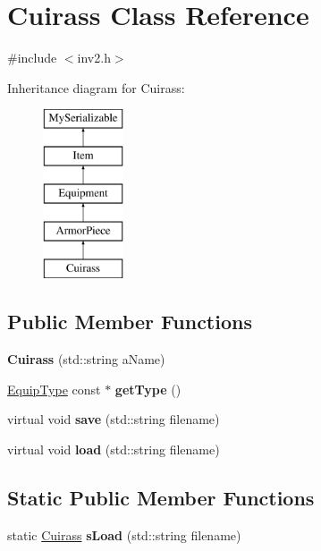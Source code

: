 \hypertarget{class_cuirass}{}\section{Cuirass Class Reference}
\label{class_cuirass}


{\ttfamily \#include $<$inv2.\+h$>$}

Inheritance diagram for Cuirass\+:\begin{figure}[H]
\begin{center}
\leavevmode
\includegraphics[height=5.000000cm]{class_cuirass}
\end{center}
\end{figure}
\subsection*{Public Member Functions}
\begin{DoxyCompactItemize}
\item 
\hypertarget{class_cuirass_a4fe284b22f6d10ab28098eac7b65ed41}{}\label{class_cuirass_a4fe284b22f6d10ab28098eac7b65ed41} 
{\bfseries Cuirass} (std\+::string a\+Name)
\item 
\hypertarget{class_cuirass_a214e66939642605ab737c5e92d72e1a2}{}\label{class_cuirass_a214e66939642605ab737c5e92d72e1a2} 
\hyperlink{class_equip_type}{Equip\+Type} const  $\ast$ {\bfseries get\+Type} ()
\item 
\hypertarget{class_cuirass_ad181561b5972934e1dcf12c9341b47a3}{}\label{class_cuirass_ad181561b5972934e1dcf12c9341b47a3} 
virtual void {\bfseries save} (std\+::string filename)
\item 
\hypertarget{class_cuirass_a94f018c99f660943107f77ddeff43e03}{}\label{class_cuirass_a94f018c99f660943107f77ddeff43e03} 
virtual void {\bfseries load} (std\+::string filename)
\end{DoxyCompactItemize}
\subsection*{Static Public Member Functions}
\begin{DoxyCompactItemize}
\item 
\hypertarget{class_cuirass_aabc3b7ab1486d7714a0b7a4f412a41e9}{}\label{class_cuirass_aabc3b7ab1486d7714a0b7a4f412a41e9} 
static \hyperlink{class_cuirass}{Cuirass} {\bfseries s\+Load} (std\+::string filename)
\end{DoxyCompactItemize}
